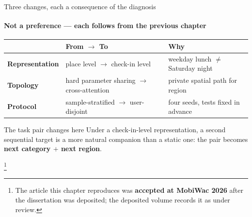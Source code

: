 \documentclass{beamer}
\begin{document}
\begin{frame}{Three changes, each a consequence of the diagnosis}
    \framesubtitle{Not a preference --- each follows from the previous chapter}

    {\small
    \setlength{\tabcolsep}{9pt}
    \renewcommand{\arraystretch}{1.32}\begin{tabular}{@{}l l l@{}}
        \toprule
                                & \textbf{From $\rightarrow$ To}                     & \textbf{Why}                          \\
        \midrule
        \textbf{Representation} & place level $\rightarrow$ \alert{check-in level}   & weekday lunch $\neq$ Saturday night   \\
        \textbf{Topology}       & hard parameter sharing $\rightarrow$ \alert{cross-attention} & private spatial path for region \\
        \textbf{Protocol}       & sample-stratified $\rightarrow$ \alert{user-disjoint} & four seeds, tests fixed in advance \\
        \bottomrule
    \end{tabular}}

    \smallskip
    \begin{alertblock}{The task pair changes here}
        \small
        Under a check-in-level representation, a second sequential target is a more natural
        companion than a static one: the pair becomes
        \textbf{next category $+$ next region}.
    \end{alertblock}
    \setlength{\parindent}{0pt}%
    \let\thefootnote\relax\footnote[frame]{%
        \hspace*{-1.55em}The article this chapter reproduces was \textbf{accepted at MobiWac 2026} after the
        dissertation was deposited; the deposited volume records it as under review.}
\end{frame}
\end{document}
